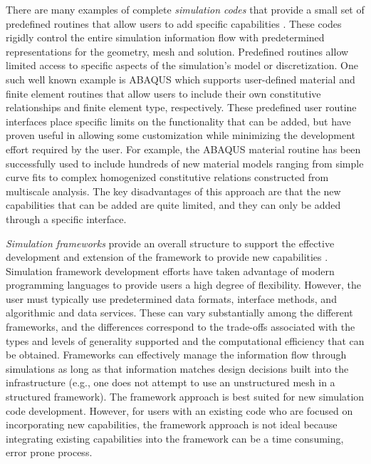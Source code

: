 There are many examples of complete {\it simulation codes} that
provide a small set of predefined routines that allow users to add
specific capabilities \cite{abaqus,ansys:http,fluent:http,kiva:http}.
These codes rigidly control the entire simulation information flow
with predetermined representations for the geometry, mesh and
solution.  Predefined routines allow limited access to specific
aspects of the simulation's model or discretization.  One such well
known example is ABAQUS \cite{abaqus} which supports user-defined
material and finite element routines that allow users to include their
own constitutive relationships and finite element type, respectively.
These predefined user routine interfaces place specific limits on the
functionality that can be added, but have proven useful in allowing
some customization while minimizing the development effort required by
the user.  For example, the ABAQUS material routine has been
successfully used to include hundreds of new material models ranging
from simple curve fits to complex homogenized constitutive relations
constructed from multiscale analysis.  The key disadvantages of this
approach are that the new capabilities that can be added are quite
limited, and they can only be added through a specific interface.

{\it Simulation frameworks} provide an overall structure to support
the effective development and extension of the framework to provide
new capabilities
\cite{BeSh99,overtureTR,pact93,BrLa97,De97,DoLa96,StEd04}.  Simulation
framework development efforts have taken advantage of modern
programming languages to provide users a high degree of
flexibility. However, the user must typically use predetermined data
formats, interface methods, and algorithmic and data services.  These
can vary substantially among the different frameworks, and the
differences correspond to the trade-offs associated with the types and
levels of generality supported and the computational efficiency that
can be obtained.  Frameworks can effectively manage the
information flow through simulations as long as that information
matches design decisions built into the infrastructure (e.g., one does
not attempt to use an unstructured mesh in a structured framework).
The framework approach is best suited for new simulation code
development. However, for users with an existing code who are
focused on incorporating new capabilities, the framework approach is
not ideal because integrating existing capabilities into the framework
can be a time consuming, error prone process.


